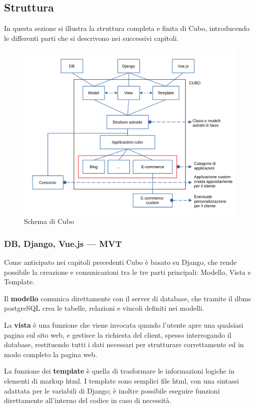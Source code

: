 \documentclass[12pt,a4paper]{article}
\begin{document}
\subsection{Struttura}
In questa sezione si illustra la struttura completa e finita di Cubo, introducendo le differenti parti che si descrivono nei successivi capitoli.
\begin{figure}[H]
    \includegraphics[width=1\linewidth]{cubo_scheme.png}
    \caption{Schema di Cubo}
\end{figure}

\subsubsection{DB, Django, Vue.js --- MVT}
Come anticipato nei capitoli precedenti Cubo è basato su Django, che rende possibile la creazione e comunicazioni tra le tre parti principali: Modello, Vista e Template.

Il \textbf{modello} comunica direttamente con il server di database, che tramite il dbms postgreSQL crea le tabelle, relazioni e vincoli definiti nei modelli.

La \textbf{vista} è una funzione che viene invocata quando l’utente apre una qualsiasi pagina sul sito web, e gestisce la richiesta del client, spesso interrogando il database, restituendo tutti i dati necessari per strutturare correttamente ed in modo completo la pagina web.

La funzione dei \textbf{template} è quella di trasformare le informazioni logiche in elementi di markup html.
I template sono semplici file html, con una sintassi adattata per le variabili di Django; è inoltre possibile eseguire funzioni direttamente all’interno del codice in caso di necessità.
\end{document}

